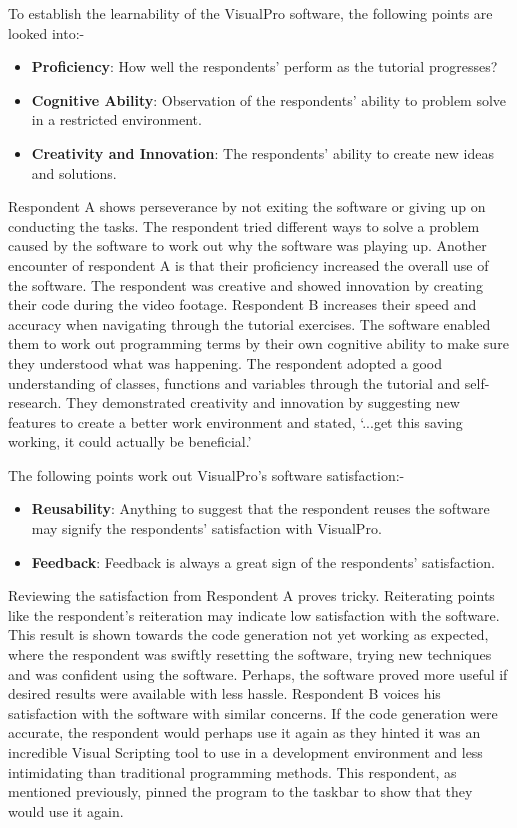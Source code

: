 \documentclass[12pt]{report} %
\begin{document}
			To establish the learnability of the VisualPro software, the following points are looked into:-
			\begin{itemize}
				\item \textbf{Proficiency}: How well the respondents' perform as the tutorial progresses?
				\item \textbf{Cognitive Ability}: Observation of the respondents' ability to problem solve in a restricted environment.
				\item \textbf{Creativity and Innovation}: The respondents' ability to create new ideas and solutions.
			\end{itemize}

			Respondent A shows perseverance by not exiting the software or giving up on conducting the tasks. The respondent tried different ways to solve a problem caused by the software to work out why the software was playing up. Another encounter of respondent A is that their proficiency increased the overall use of the software. The respondent was creative and showed innovation by creating their code during the video footage. Respondent B increases their speed and accuracy when navigating through the tutorial exercises. The software enabled them to work out programming terms by their own cognitive ability to make sure they understood what was happening. The respondent adopted a good understanding of classes, functions and variables through the tutorial and self-research. They demonstrated creativity and innovation by suggesting new features to create a better work environment and stated, `...get this saving working, it could actually be beneficial.'

			The following points work out VisualPro's software satisfaction:-
			\begin{itemize}
				\item \textbf{Reusability}: Anything to suggest that the respondent reuses the software may signify the respondents' satisfaction with VisualPro.
				\item \textbf{Feedback}: Feedback is always a great sign of the respondents' satisfaction.
			\end{itemize}

			Reviewing the satisfaction from Respondent A proves tricky. Reiterating points like the respondent's reiteration may indicate low satisfaction with the software. This result is shown towards the code generation not yet working as expected, where the respondent was swiftly resetting the software, trying new techniques and was confident using the software. Perhaps, the software proved more useful if desired results were available with less hassle. Respondent B voices his satisfaction with the software with similar concerns. If the code generation were accurate, the respondent would perhaps use it again as they hinted it was an incredible Visual Scripting tool to use in a development environment and less intimidating than traditional programming methods. This respondent, as mentioned previously, pinned the program to the taskbar to show that they would use it again.
			
\end{document}
